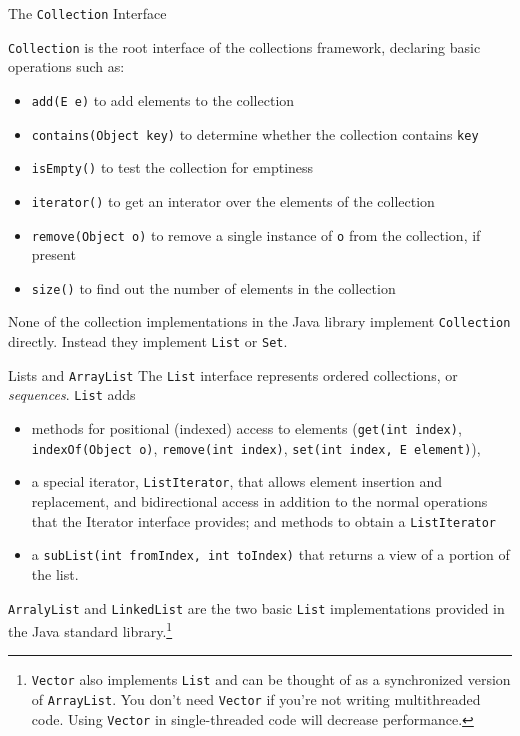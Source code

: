 \documentclass{beamer}
\begin{document}
\begin{frame}[fragile]{The {\tt Collection} Interface}


{\tt Collection} is the root interface of the collections framework, declaring basic operations such as:
\begin{itemize}
\item {\tt add(E e)} to add elements to the collection
\item {\tt contains(Object key)} to determine whether the collection contains {\tt key}
\item {\tt isEmpty()} to test the collection for emptiness
\item {\tt iterator()} to get an interator over the elements of the collection
\item {\tt remove(Object o)} to remove a single instance of {\tt o} from the collection, if present
\item {\tt size()} to find out the number of elements in the collection
\end{itemize}
None of the collection implementations in the Java library implement {\tt Collection} directly.  Instead they implement {\tt List} or {\tt Set}.

\end{frame}


\begin{frame}[fragile]{Lists and {\tt ArrayList}}
\vspace{-.05in}
The {\tt List} interface represents ordered collections, or {\it sequences}.  {\tt List} adds
\vspace{-.05in}  
\begin{itemize}
\item methods for positional (indexed) access to elements ({\tt get(int index)}, {\tt indexOf(Object o)}, {\tt remove(int index)}, {\tt set(int index, E element)}), 
\item a special iterator, {\tt ListIterator}, that allows element insertion and replacement, and bidirectional access in addition to the normal operations that the Iterator interface provides; and methods to obtain a {\tt ListIterator}
\item a {\tt subList(int fromIndex, int toIndex)} that returns a view of a portion of the list.
\end{itemize}
{\tt ArralyList} and {\tt LinkedList} are the two basic {\tt List} implementations provided in the Java standard library.\footnote{{\tt Vector} also implements {\tt List} and can be thought of as a synchronized version of {\tt ArrayList}.  You don't need {\tt Vector} if you're not writing multithreaded code.  Using {\tt Vector} in single-threaded code will decrease performance.}
\end{frame}
\end{document}
